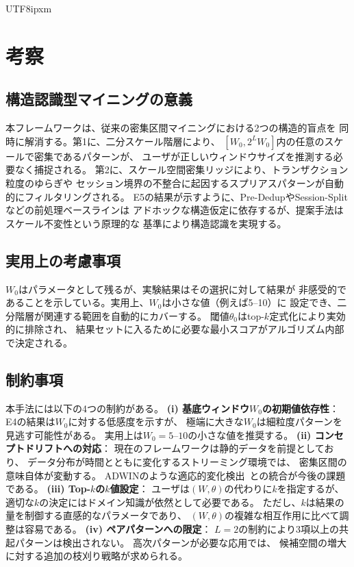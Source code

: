 \documentclass[conference]{IEEEtran}
\begin{document}
\begin{CJK}{UTF8}{ipxm}
\section{考察}\label{sec:discussion}

\subsection{構造認識型マイニングの意義}

本フレームワークは、従来の密集区間マイニングにおける2つの構造的盲点を
同時に解消する。第1に、二分スケール階層により、
$[W_0, 2^L W_0]$内の任意のスケールで密集であるパターンが、
ユーザが正しいウィンドウサイズを推測する必要なく捕捉される。
第2に、スケール空間密集リッジにより、トランザクション粒度のゆらぎや
セッション境界の不整合に起因するスプリアスパターンが自動的にフィルタリングされる。
E5の結果が示すように、Pre-DedupやSession-Splitなどの前処理ベースラインは
アドホックな構造仮定に依存するが、提案手法はスケール不変性という原理的な
基準により構造認識を実現する。

\subsection{実用上の考慮事項}

$W_0$はパラメータとして残るが、実験結果はその選択に対して結果が
非感受的であることを示している。実用上、$W_0$は小さな値（例えば5--10）に
設定でき、二分階層が関連する範囲を自動的にカバーする。
閾値$\theta_0$はtop-$k$定式化により実効的に排除され、
結果セットに入るために必要な最小スコアがアルゴリズム内部で決定される。

\subsection{制約事項}

本手法には以下の4つの制約がある。
\textbf{(i) 基底ウィンドウ$W_0$の初期値依存性}：
E4の結果は$W_0$に対する低感度を示すが、
極端に大きな$W_0$は細粒度パターンを見逃す可能性がある。
実用上は$W_0 = 5$--$10$の小さな値を推奨する。
\textbf{(ii) コンセプトドリフトへの対応}：
現在のフレームワークは静的データを前提としており、
データ分布が時間とともに変化するストリーミング環境では、
密集区間の意味自体が変動する。
ADWINのような適応的変化検出~\cite{bifet2007adwin}との統合が今後の課題である。
\textbf{(iii) Top-$k$の$k$値設定}：
ユーザは$(W, \theta)$の代わりに$k$を指定するが、
適切な$k$の決定にはドメイン知識が依然として必要である。
ただし、$k$は結果の量を制御する直感的なパラメータであり、
$(W, \theta)$の複雑な相互作用に比べて調整は容易である。
\textbf{(iv) ペアパターンへの限定}：
$L{=}2$の制約により3項以上の共起パターンは検出されない。
高次パターンが必要な応用では、
候補空間の増大に対する追加の枝刈り戦略が求められる。


\end{CJK}
\end{document}

